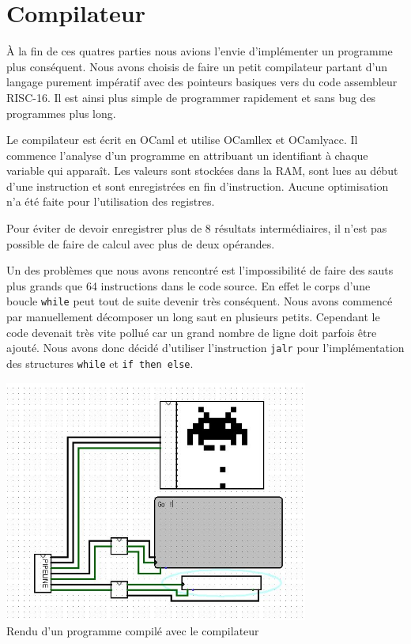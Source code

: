 \documentclass[a4paper]{article}
\begin{document}
  \section{Compilateur}

  À la fin de ces quatres parties nous avions l'envie d'implémenter un programme plus conséquent. Nous avons choisis de faire un petit compilateur partant d'un langage purement impératif avec des pointeurs basiques vers du code assembleur RISC-16. Il est ainsi plus simple de programmer rapidement et sans bug des programmes plus long.

Le compilateur est écrit en OCaml et utilise OCamllex et OCamlyacc. Il commence l'analyse d'un programme en attribuant un identifiant à chaque variable qui apparaît. Les valeurs sont stockées dans la RAM, sont lues au début d'une instruction et sont enregistrées en fin d'instruction. Aucune optimisation n'a été faite pour l'utilisation des registres.

Pour éviter de devoir enregistrer plus de 8 résultats intermédiaires, il n'est pas possible de faire de calcul avec plus de deux opérandes.

Un des problèmes que nous avons rencontré est l'impossibilité de faire des sauts plus grands que 64 instructions dans le code source. En effet le corps d'une boucle \verb|while| peut tout de suite devenir très conséquent. Nous avons commencé par manuellement décomposer un long saut en plusieurs petits. Cependant le code devenait très vite pollué car un grand nombre de ligne doit parfois être ajouté. Nous avons donc décidé d'utiliser l'instruction \verb|jalr| pour l'implémentation des structures \verb|while| et \verb|if then else|.

  \begin{center}
    \includegraphics[width=10cm]{space_invaders.jpg}\\
    Rendu d'un programme compilé avec le compilateur
  \end{center}
\end{document}
